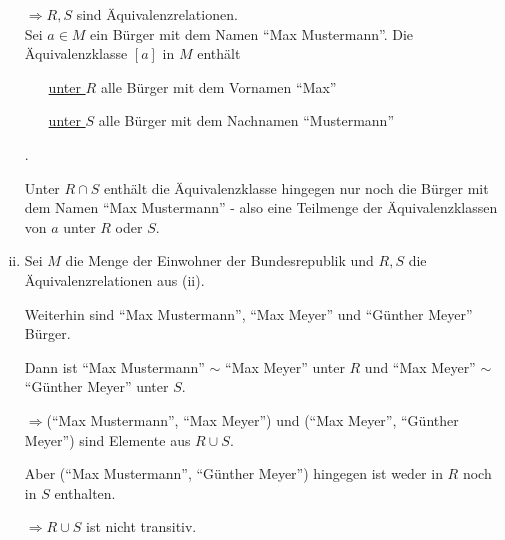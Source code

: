 \documentclass{scrreprt}
\begin{document}
\begin{enumerate}[(i)]
  $\Rightarrow R, S$ sind Äquivalenzrelationen. \\

  Sei $a \in M$ ein Bürger mit dem Namen ``Max Mustermann''.
  Die Äquivalenzklasse $[a]$ in $M$ enthält
  \begin{itemize}
  \item[\underline{unter $R$}] alle Bürger mit dem Vornamen ``Max''
  \item[\underline{unter $S$}] alle Bürger mit dem Nachnamen ``Mustermann''
  \end{itemize}.

  Unter $R \cap S$ enthält die Äquivalenzklasse hingegen nur noch die Bürger mit
  dem Namen ``Max Mustermann'' - also eine Teilmenge der Äquivalenzklassen von
  $a$ unter $R$ oder $S$.

\item Sei $M$ die Menge der Einwohner der Bundesrepublik und $R, S$ die
  Äquivalenzrelationen aus (ii).

  Weiterhin sind ``Max Mustermann'', ``Max Meyer'' und ``Günther Meyer''
  Bürger.

  Dann ist ``Max Mustermann'' $\sim$ ``Max Meyer'' unter $R$ und
  ``Max Meyer'' $\sim$ ``Günther Meyer'' unter $S$.

  $\Rightarrow $(``Max Mustermann'', ``Max Meyer'') und
  (``Max Meyer'', ``Günther Meyer'') sind Elemente aus $R \cup S$.

  Aber (``Max Mustermann'', ``Günther Meyer'') hingegen ist weder in $R$ noch in $S$ enthalten.

  $\Rightarrow R \cup S$ ist nicht transitiv.
\end{enumerate}
\end{document}
